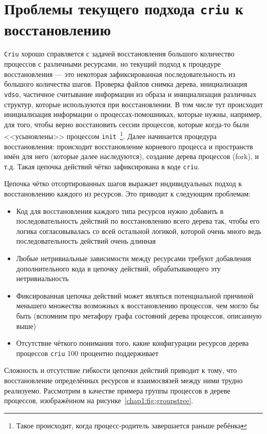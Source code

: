 \section{Проблемы текущего подхода \texttt{criu} к восстановлению}

\texttt{Criu} хорошо справляется с задачей восстановления большого количество процессов с различными ресурсами, но
текущий подход к процедуре восстановления --- это некоторая зафиксированная последовательность из большого количества шагов. Проверка файлов снимка дерева, инициализация \texttt{vdso}, частичное считывание информации из образа и инициализация различных структур, которые используются при восстановлении. В том числе тут происходит инициализация информации о процессах-помошниках, которые нужны, например, для того, чтобы верно восстановить сессии процессов, которые когда-то были <<усыновлены>> процессом \texttt{init}~\footnote{Такое происходит, когда процесс-родитель завершается раньше ребёнка}. Далее начинается процедура восстановления: происходит восстановление корневого процесса и пространств имён для него (которые далее наследуются), создание дерева процессов (fork), и т.д. Такая цепочка действий чётко зафиксирована в коде \texttt{criu}.

Цепочка чётко отсортированных шагов выражает индивидуальных подход к восстановлению каждого из ресурсов. Это приводит к следующим проблемам:

\begin{itemize}
	\item Код для восстановления каждого типа ресурсов нужно добавить в последовательность действий по восстановлению всего дерева так, чтобы его логика согласовывалась со всей остальной логикой, которой очень много ведь последовательность действий очень длинная
	\item Любые нетривиальные зависимости между ресурсами требуют добавления дополнительного кода в цепочку действий, обрабатывающего эту нетривиальность
	\item Фиксированная цепочка действий может являться потенциальной причиной меньшего множества возможных к восстановлению процессов, чем могло бы быть (вспомним про метафору графа состояний дерева процессов, описанную выше)
	\item Отсутствие чёткого понимания того, какие конфигурации ресурсов дерева процессов \texttt{criu} 100 процентно поддерживает
\end{itemize}

Сложность и отсутствие гибкости цепочки действий приводит к тому, что восстановление определённых ресурсов и взаимосвязей между ними трудно реализуемо. Рассмотрим в качестве примера группы процессов в дереве процессов, изображённом на рисунке~\ref{chap1:fig:groupstree}.


